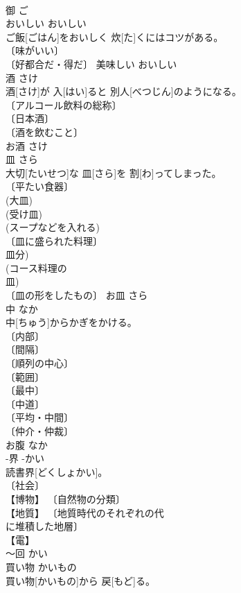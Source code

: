 \documentclass[8pt]{extreport}
\begin{document}
\begin{CJK}{UTF8}{min}
\\	御	ご	
\\	おいしい	おいしい	
\\	ご飯[ごはん]をおいしく 炊[た]くにはコツがある。	
\\	〔味がいい〕 
\\	〔好都合だ・得だ〕	美味しい	おいしい	
\\	酒	さけ	
\\	酒[さけ]が 入[はい]ると 別人[べつじん]のようになる。	
\\	〔アルコール飲料の総称〕 
\\	〔日本酒〕 
\\	〔酒を飲むこと〕 
\\	お酒	さけ	
\\	皿	さら	
\\	大切[たいせつ]な 皿[さら]を 割[わ]ってしまった。	
\\	〔平たい食器〕 
\\	(大皿) 
\\	(受け皿) 
\\	(スープなどを入れる) 
\\	〔皿に盛られた料理〕 
\\	皿分) 
\\	(コース料理の 
\\	皿) 
\\	〔皿の形をしたもの〕	お皿	さら	
\\	中	なか	
\\	中[ちゅう]からかぎをかける。	
\\	〔内部〕 
\\	〔間隔〕 
\\	〔順列の中心〕 
\\	〔範囲〕 
\\	〔最中〕 
\\	〔中道〕 
\\	〔平均・中間〕 
\\	〔仲介・仲裁〕 
\\	お腹	なか	
\\	-界	-かい	
\\	読書界[どくしょかい]。	
\\	〔社会〕 
\\	【博物】 〔自然物の分類〕 
\\	【地質】 〔地質時代のそれぞれの代 
\\	に堆積した地層〕 
\\	【電】 
\\	[⇒でんかい１, じかい８]	〜回	かい	
\\	買い物	かいもの	
\\	買い物[かいもの]から 戻[もど]る。	

\end{CJK}
\end{document}
